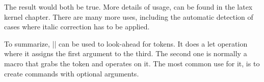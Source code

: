 \smallskip
\begin{Code}
\def\@ifstar#1{\@ifnextchar *{\@firstoftwo{#1}}}
\end{Code}
\smallskip

The result would both be true. More details of usage, can be found in the latex kernel chapter. There are many more uses, including the automatic detection of cases where italic correction has to be applied.

To summarize, |\futurelet| can be used to look-ahead for tokens. It does a let operation where it assigns the first argument to the third. The second one is normally a macro that grabs the token and operates on it. The most common use for it, is to create commands with optional arguments.



















